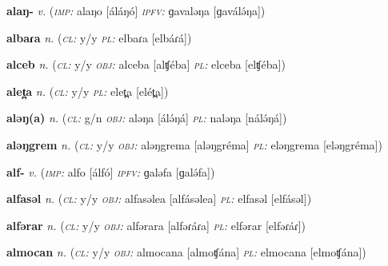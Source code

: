 \newentry
\headword\textbf{alaŋ-}
\ipa{[áláŋó-]}
\synpos\textit{v.} 
\imperative(\textit {\textsc{imp:}} alaŋo [áláŋó] 
\imperfective\textit{\textsc{ipfv:}} ɡavaləŋa [ɡaválə́ŋa])

\newentry
\headword\textbf{albaɾa}
\ipa{[albáɾá]}
\synpos\textit{n.} 
\class(\textit{\textsc{cl:}} {y/y}
\plural\textit{\textsc{pl:}} elbaɾa [elbáɾá])

\newentry
\headword\textbf{alceb}
\ipa{[alʧéb]}
\synpos\textit{n.} 
\class(\textit{\textsc{cl:}} {y/y}
\object\textit{\textsc{obj:}} alceba [alʧéba]
\plural\textit{\textsc{pl:}} elceba [elʧéba])

\newentry
\headword\textbf{alet̪a}
\ipa{[alét̪a]}
\synpos\textit{n.} 
\class(\textit{\textsc{cl:}} {y/y}
\plural\textit{\textsc{pl:}} elet̪a [elét̪a])

\newentry
\headword\textbf{aləŋ(a)}
\ipa{[álə́ŋ(á)]}
\synpos\textit{n.} 
\class(\textit{\textsc{cl:}} {g/n}
\object\textit{\textsc{obj:}} aləŋa [álə́ŋá]
\plural\textit{\textsc{pl:}} naləŋa [nálə́ŋá])

\newentry
\headword\textbf{aləŋgrem}
\ipa{[aləŋgrém]}
\synpos\textit{n.} 
\class(\textit{\textsc{cl:}} {y/y}
\object\textit{\textsc{obj:}} aləŋgrema [aləŋgréma]
\plural\textit{\textsc{pl:}} eləŋgrema [eləŋgréma])

\newentry
\headword\textbf{alf-}
\ipa{[álf-]}
\synpos\textit{v.} 
\imperative(\textit {\textsc{imp:}} alfo [álfó] 
\imperfective\textit{\textsc{ipfv:}} ɡaləfa [ɡalə́fa])

\newentry
\headword\textbf{alfasəl}
\synpos\textit{n.} 
\class(\textit{\textsc{cl:}} {y/y}
\object\textit{\textsc{obj:}} alfasəlea [alfásəlea]
\plural\textit{\textsc{pl:}} elfasəl [elfásəl])

\newentry
\headword\textbf{alfərar}
\ipa{[alfəɾáɾ]}
\synpos\textit{n.} 
\class(\textit{\textsc{cl:}} {y/y}
\object\textit{\textsc{obj:}} alfərara [alfəɾáɾa]
\plural\textit{\textsc{pl:}} elfərar [elfəɾáɾ])

\newentry
\headword\textbf{almocan}
\ipa{[almoʧán]}
\synpos\textit{n.} 
\class(\textit{\textsc{cl:}} {y/y}
\object\textit{\textsc{obj:}} almocana [almoʧána]
\plural\textit{\textsc{pl:}} elmocana [elmoʧána])

